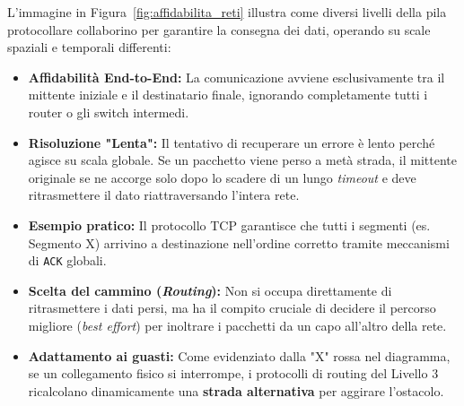 \documentclass[a4paper,12pt]{report}
\begin{document}
\noindent
L'immagine in Figura~\ref{fig:affidabilita_reti} illustra come diversi livelli della pila protocollare collaborino per garantire la consegna dei dati, operando su scale spaziali e temporali differenti:

\vspace{0.3cm}

\begin{tcolorbox}[colback=red!5!white, colframe=red!70!black, title=\textbf{Livello 4 -- Trasporto (Controllo Globale)}]
\begin{itemize}[leftmargin=*]
    \item \textbf{Affidabilità End-to-End:} La comunicazione avviene esclusivamente tra il mittente iniziale e il destinatario finale, ignorando completamente tutti i router o gli switch intermedi.
    \item \textbf{Risoluzione "Lenta":} Il tentativo di recuperare un errore è lento perché agisce su scala globale. Se un pacchetto viene perso a metà strada, il mittente originale se ne accorge solo dopo lo scadere di un lungo \textit{timeout} e deve ritrasmettere il dato riattraversando l'intera rete.
    \item \textbf{Esempio pratico:} Il protocollo TCP garantisce che tutti i segmenti (es. Segmento X) arrivino a destinazione nell'ordine corretto tramite meccanismi di \texttt{ACK} globali.
\end{itemize}
\end{tcolorbox}

\begin{tcolorbox}[colback=orange!5!white, colframe=orange!90!black, title=\textbf{Livello 3 -- Rete (Instradamento)}]
\begin{itemize}[leftmargin=*]
    \item \textbf{Scelta del cammino (\textit{Routing}):} Non si occupa direttamente di ritrasmettere i dati persi, ma ha il compito cruciale di decidere il percorso migliore (\textit{best effort}) per inoltrare i pacchetti da un capo all'altro della rete.
    \item \textbf{Adattamento ai guasti:} Come evidenziato dalla "X" rossa nel diagramma, se un collegamento fisico si interrompe, i protocolli di routing del Livello 3 ricalcolano dinamicamente una \textbf{strada alternativa} per aggirare l'ostacolo.
\end{itemize}
\end{tcolorbox}
\end{document}
